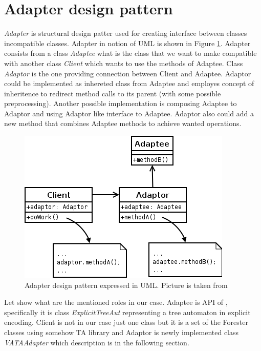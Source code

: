 \section{Adapter design pattern}
\label{sec:adapter}

\emph{Adapter} is structural design patter \cite{gamma} used for creating interface between classes incompatible classes.
Adapter in notion of UML is shown in Figure \ref{fig:adapter}.
Adapter consists from a class \emph{Adaptee} what is the class that we want to make compatible with
another class \emph{Client} which wants to use the methods of Adaptee.
Class \emph{Adaptor} is the one providing connection between Client and Adaptee.
Adaptor could be implemented as inhereted class from Adaptee and employes concept of inheritence to redirect
method calls to its parent (with some possible preprocessing).
Another possible implementation is composing Adaptee to Adaptor and using Adaptor like interface to Adaptee.
Adaptor also could add a new method that combines Adaptee methods to achieve wanted operations.

\begin{figure}
	\begin{center}
		\includegraphics[scale=0.5]{fig/adapter.png}
	\end{center}
	\caption{Adapter design pattern expressed in UML.
	Picture is taken from \cite{wikihttp://en.wikipedia.org/wiki/Adapter_pattern}}
	\label{fig:adapter}
\end{figure}

Let show what are the mentioned roles in our case.
Adaptee is API of \vata, specifically it is class \emph{ExplicitTreeAut} representing a tree automaton in explicit encoding.
Client is not in our case just one class but it is a set of the Forester classes using somehow TA library
and Adaptor is newly implemented class \emph{VATAAdapter} which description is in the following section.

